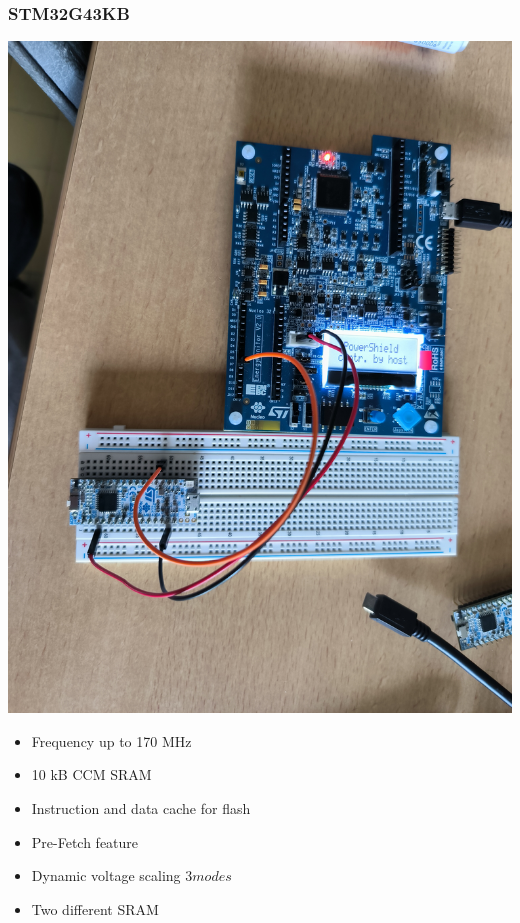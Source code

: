 \documentclass[
	11pt, %
]{beamer}
\begin{document}
\begin{frame}
    \frametitle{STM32G43KB}
	\centering
    \begin{minipage}{0.4\textwidth}
		\includegraphics[scale = 0.04]{images/stm32g.jpg}
	\end{minipage}
	\begin{minipage}{0.50\textwidth}
		\centering
		\begin{itemize}
			\item Frequency up to 170 MHz 
			\item 10 kB CCM SRAM 
			\item Instruction and data cache for flash 
			\item Pre-Fetch feature
			\item Dynamic voltage scaling \(3 modes\)
			\item Two different SRAM
		\end{itemize}
		\end{minipage}
\end{frame}
\end{document}
